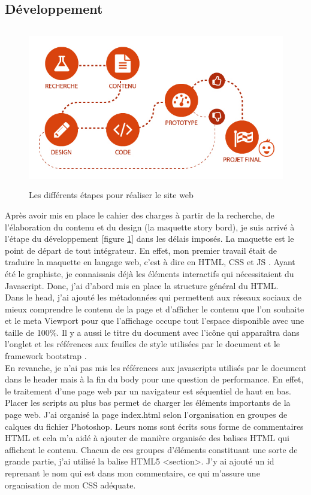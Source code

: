 \documentclass[a4paper, 12pt]{report}
\begin{document}
\subsection{Développement}
\begin{figure}[!htbp]
\centering
\includegraphics[height=7cm]{images/developement.png}
\caption{Les différents étapes pour réaliser le site web}
\label{fig:4.9}
\end{figure}

Après avoir mis en place le cahier des charges à partir de la recherche, de l'élaboration du contenu et du design (la maquette story bord), je suis arrivé à l'étape du développement [figure \ref{fig:4.9}] dans les délais imposés. 
La maquette est le point de départ de tout intégrateur. En effet, mon premier travail était de traduire la maquette en langage web, c’est à dire en HTML, CSS et JS \cite{4}. Ayant été le graphiste, je connaissais déjà les éléments interactifs qui nécessitaient du Javascript. Donc, j’ai d’abord mis en place la structure général du HTML.\\
Dans le head, j’ai ajouté les métadonnées qui permettent aux réseaux sociaux de mieux comprendre le contenu de la page et d’afficher le contenu que l’on souhaite et le meta Viewport pour que l'affichage occupe tout l'espace disponible avec une taille de 100\%. Il y a aussi le titre du document avec l'icône qui apparaîtra dans l’onglet et les références aux feuilles de style utilisées par le document et le framework bootstrap \cite{5}.\\
En revanche, je n’ai pas mis les références aux javascripts utilisés par le document dans le header mais à la fin du body pour une question de performance. En effet, le traitement d'une page web par un navigateur est séquentiel de haut en bas. Placer les scripts au plus bas permet de charger les éléments importants de la page web.
J’ai organisé la page index.html selon l'organisation en groupes de calques du fichier Photoshop. Leurs noms sont écrits sous forme de commentaires HTML et cela m’a aidé à ajouter de manière organisée des balises HTML qui affichent le contenu.
Chacun de ces groupes d'éléments constituant une sorte de grande partie, j’ai utilisé la balise HTML5 <section>. J’y ai ajouté un id reprenant le nom qui est dans mon commentaire, ce qui  m’assure une organisation  de mon CSS adéquate.\\
\end{document}
